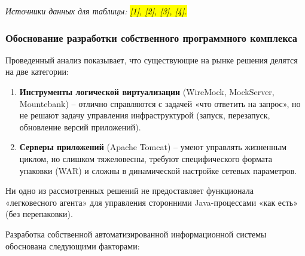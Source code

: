 \documentclass[
]{article}
\begin{document}
\emph{Источники данных для таблицы:} \emph{\hl{{[}1{]}, {[}2{]},
{[}3{]}, {[}4{]}.}}

\subsubsection{Обоснование разработки собственного программного
комплекса}\label{ux43eux431ux43eux441ux43dux43eux432ux430ux43dux438ux435-ux440ux430ux437ux440ux430ux431ux43eux442ux43aux438-ux441ux43eux431ux441ux442ux432ux435ux43dux43dux43eux433ux43e-ux43fux440ux43eux433ux440ux430ux43cux43cux43dux43eux433ux43e-ux43aux43eux43cux43fux43bux435ux43aux441ux430}

Проведенный анализ показывает, что существующие на рынке решения делятся
на две категории:

\begin{enumerate}
\def\labelenumi{\arabic{enumi}.}
\item
  \textbf{Инструменты логической виртуализации} (WireMock, MockServer,
  Mountebank) -- отлично справляются с задачей «что ответить на запрос»,
  но не решают задачу управления инфраструктурой (запуск, перезапуск,
  обновление версий приложений).
\item
  \textbf{Серверы приложений} (Apache Tomcat) -- умеют управлять
  жизненным циклом, но слишком тяжеловесны, требуют специфического
  формата упаковки (WAR) и сложны в динамической настройке сетевых
  параметров.
\end{enumerate}

Ни одно из рассмотренных решений не предоставляет функционала
«легковесного агента» для управления сторонними Java-процессами «как
есть» (без перепаковки).

Разработка собственной автоматизированной информационной системы
обоснована следующими факторами:
\end{document}
